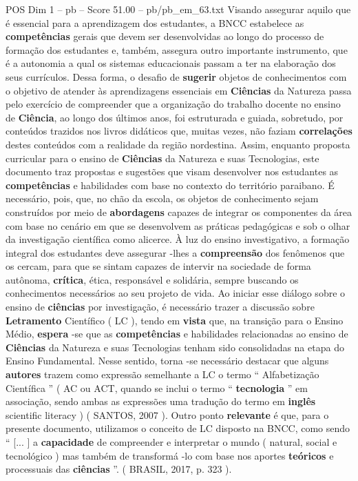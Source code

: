 \begin{textsample}{POS Dim 1 – pb – Score 51.00 – pb/pb\_em\_63.txt}
Visando assegurar aquilo que é essencial para a aprendizagem dos estudantes, a BNCC estabelece as \textbf{competências} gerais que devem ser desenvolvidas ao longo do processo de formação dos estudantes e, também, assegura outro importante instrumento, que é a autonomia a qual os sistemas educacionais passam a ter na elaboração dos seus currículos.
Dessa forma, o desafio de \textbf{sugerir} objetos de conhecimentos com o objetivo de atender às aprendizagens essenciais em \textbf{Ciências} da Natureza passa pelo exercício de compreender que a organização do trabalho docente no ensino de \textbf{Ciência}, ao longo dos últimos anos, foi estruturada e guiada, sobretudo, por conteúdos trazidos nos livros didáticos que, muitas vezes, não faziam \textbf{correlações} destes conteúdos com a realidade da região nordestina.
Assim, enquanto proposta curricular para o ensino de \textbf{Ciências} da Natureza e suas Tecnologias, este documento traz propostas e sugestões que visam desenvolver nos estudantes as \textbf{competências} e habilidades com base no contexto do território paraibano.
É necessário, pois, que, no chão da escola, os objetos de conhecimento sejam construídos por meio de \textbf{abordagens} capazes de integrar os componentes da área com base no cenário em que se desenvolvem as práticas pedagógicas e sob o olhar da investigação científica como alicerce.
À luz do ensino investigativo, a formação integral dos estudantes deve assegurar -lhes a \textbf{compreensão} dos fenômenos que os cercam, para que se sintam capazes de intervir na sociedade de forma autônoma, \textbf{crítica}, ética, responsável e solidária, sempre buscando os conhecimentos necessários ao seu projeto de vida.
Ao iniciar esse diálogo sobre o ensino de \textbf{ciências} por investigação, é necessário trazer a discussão sobre \textbf{Letramento} Científico ( LC ), tendo em \textbf{vista} que, na transição para o Ensino Médio, \textbf{espera} -se que as \textbf{competências} e habilidades relacionadas ao ensino de \textbf{Ciências} da Natureza e suas Tecnologias tenham sido consolidadas na etapa do Ensino Fundamental.
Nesse sentido, torna -se necessário destacar que alguns \textbf{autores} trazem como expressão semelhante a LC o termo “ Alfabetização Científica ” ( AC ou ACT, quando se inclui o termo “ \textbf{tecnologia} ” em associação, sendo ambas as expressões uma tradução do termo em \textbf{inglês} scientific literacy ) ( SANTOS, 2007 ).
Outro ponto \textbf{relevante} é que, para o presente documento, utilizamos o conceito de LC disposto na BNCC, como sendo “ [... ] a \textbf{capacidade} de compreender e interpretar o mundo ( natural, social e tecnológico ) mas também de transformá -lo com base nos aportes \textbf{teóricos} e processuais das \textbf{ciências} ”. ( BRASIL, 2017, p. 323 ).

\end{textsample}
